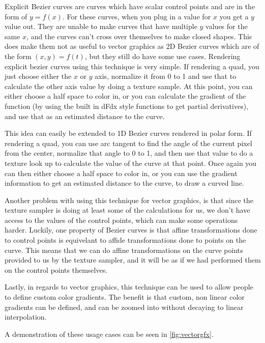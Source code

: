 \documentclass{jcgt}
\begin{document}
Explicit Bezier curves are curves which have scalar control points and are in the form of $y=f(x)$.  For these curves, when you plug in a value for $x$ you get a $y$ value out.  They are unable to make curves that have multiple $y$ values for the same $x$, and the curves can't cross over themselves to make closed shapes.  This does make them not as useful to vector graphics as 2D Bezier curves which are of the form $(x,y) = f(t)$, but they still do have some use cases.  Rendering explicit bezier curves using this technique is very simple.  If rendering a quad, you just choose either the $x$ or $y$ axis, normalize it from 0 to 1 and use that to calculate the other axis value by doing a texture sample.  At this point, you can either choose a half space to color in, or you can calculate the gradient of the function (by using the built in dFdx style functions to get partial derivatives), and use that as an estimated distance to the curve.

This idea can easily be extended to 1D Bezier curves rendered in polar form.  If rendering a quad, you can use arc tangent to find the angle of the current pixel from the center, normalize that angle to 0 to 1, and then use that value to do a texture look up to calculate the value of the curve at that point.  Once again you can then either choose a half space to color in, or you can use the gradient information to get an estimated distance to the curve, to draw a curved line.

Another problem with using this technique for vector graphics, is that since the texture sampler is doing at least some of the calculations for us, we don't have access to the values of the control points, which can make some operations harder.  Luckily, one property of Bezier curves is that affine transformations done to control points is equivelant to affide transformations done to points on the curve.  This means that we can do affine transformations on the curve points provided to us by the texture sampler, and it will be as if we had performed them on the control points themselves.

Lastly, in regards to vector graphics, this technique can be used to allow people to define custom color gradients.  The benefit is that custom, non linear color gradients can be defined, and can be zoomed into without decaying to linear interpolation.

A demonstration of these usage cases can be seen in \autoref{fig:vectorgfx}.

\end{document}
